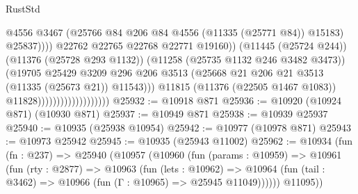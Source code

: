 \begin{lexlean}{RustStd}
\begin{coremodule}
{\begin{coremodule}
{{{{{{{{{{{{{{{{{{{{{{{{{{{{{{{{{{{{{{{{{{{{{{{{{{{{{{{{{{{{{{{{{{{{{{{{{{{{{{{{{{{{{                                                        @4556
                                                        @3467
                                                        (@25766
                                                          @84
                                                          @206
                                                          @84
                                                          @4556
                                                          (@11335 (@25771 @84))
                                                          @15183)
                                                        @25837))))
                                                @22762
                                                @22765
                                                @22768
                                                @22771
                                                @19160))
                                            (@11445 (@25724 @244))
                                            (@11376 (@25728 @293 @1132))
                                            (@11258 (@25735 @1132 @246 @3482 @3473))
                                            (@19705
                                              @25429
                                              @3209
                                              @296
                                              @206
                                              @3513
                                              (@25668
                                                @21
                                                @206
                                                @21
                                                @3513
                                                (@11335 (@25673 @21))
                                                @11543)))
                                          @11815
                                          (@11376 (@22505 @1467 @1083))
                                          @11828)))))))))))))))))))
@25932 := @10918 @871
@25936 := @10920 (@10924 @871) (@10930 @871)
@25937 := @10949 @871
@25938 := @10939 @25937
@25940 := @10935 (@25938 @10954)
@25942 := @10977 (@10978 @871)
@25943 := @10973 @25942
@25945 := @10935 (@25943 @11002)
@25962 := @10934
    (fun (fn : @237) =>
    @25940
      (@10957
        (@10960
          (fun (params : @10959) =>
          @10961
            (fun (rty : @2877) =>
            @10963
              (fun (lets : @10962) =>
              @10964 (fun (tail : @3462) => @10966 (fun (Γ : @10965) => @25945 @11049))))))
        @11095))
}}}}}}}}}}}}}}}}}}}}}}}}}}}}}}}}}}}}}}}}}}}}}}}}}}}}}}}}}}}}}}}}}}}}}}}}}}}}}}}}}}}}}
\end{coremodule}}
\end{coremodule}
\end{lexlean}
